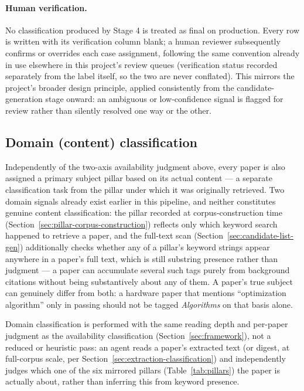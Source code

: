 \documentclass[11pt]{article}
\begin{document}
\paragraph{Human verification.} No classification produced by Stage 4 is treated as
final on production. Every row is written with its verification column blank; a human
reviewer subsequently confirms or overrides each case assignment, following the same
convention already in use elsewhere in this project's review queues (verification
status recorded separately from the label itself, so the two are never conflated).
This mirrors the project's broader design principle, applied consistently from the
candidate-generation stage onward: an ambiguous or low-confidence signal is flagged for
review rather than silently resolved one way or the other.

\subsection{Domain (content) classification}
\label{sec:domain-classification}

Independently of the two-axis availability judgment above, every paper is also
assigned a primary subject pillar based on its actual content --- a separate
classification task from the pillar under which it was originally retrieved. Two
domain signals already exist earlier in this pipeline, and neither constitutes genuine
content classification: the pillar recorded at corpus-construction time
(Section~\ref{sec:pillar-corpus-construction}) reflects only which keyword search
happened to retrieve a paper, and the full-text scan (Section~\ref{sec:candidate-list-gen})
additionally checks whether any of a pillar's keyword strings appear anywhere in a
paper's full text, which is still substring presence rather than judgment --- a paper
can accumulate several such tags purely from background citations without being
substantively about any of them. A paper's true subject can genuinely differ from
both: a hardware paper that mentions ``optimization algorithm'' only in passing should
not be tagged \emph{Algorithms} on that basis alone.

Domain classification is performed with the same reading depth and per-paper judgment
as the availability classification (Section~\ref{sec:framework}), not a reduced or
heuristic pass: an agent reads a paper's extracted text (or digest, at full-corpus
scale, per Section~\ref{sec:extraction-classification}) and independently judges which
one of the six mirrored pillars (Table~\ref{tab:pillars}) the paper is actually about,
rather than inferring this from keyword presence.
\end{document}
